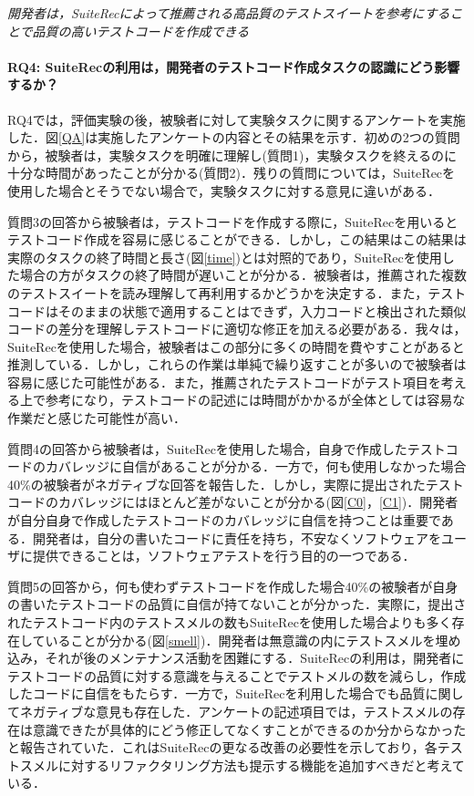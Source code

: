 \documentclass[12pt]{jarticle} %
\begin{document}
\begin{breakbox}
\textit{開発者は，{\sf SuiteRec}によって推薦される高品質のテストスイートを参考にすることで品質の高いテストコードを作成できる}
\end{breakbox}

\paragraph{RQ4: {\sf SuiteRec}の利用は，開発者のテストコード作成タスクの認識にどう影響するか？}

RQ4では，評価実験の後，被験者に対して実験タスクに関するアンケートを実施した．図\ref{QA}は実施したアンケートの内容とその結果を示す．初めの2つの質問から，被験者は，実験タスクを明確に理解し(質問1)，実験タスクを終えるのに十分な時間があったことが分かる(質問2)．残りの質問については，{\sf SuiteRec}を使用した場合とそうでない場合で，実験タスクに対する意見に違いがある．

質問3の回答から被験者は，テストコードを作成する際に，{\sf SuiteRec}を用いるとテストコード作成を容易に感じることができる．しかし，この結果はこの結果は実際のタスクの終了時間と長さ(図\ref{time})とは対照的であり，{\sf SuiteRec}を使用した場合の方がタスクの終了時間が遅いことが分かる．被験者は，推薦された複数のテストスイートを読み理解して再利用するかどうかを決定する．また，テストコードはそのままの状態で適用することはできず，入力コードと検出された類似コードの差分を理解しテストコードに適切な修正を加える必要がある．我々は，{\sf SuiteRec}を使用した場合，被験者はこの部分に多くの時間を費やすことがあると推測している．しかし，これらの作業は単純で繰り返すことが多いので被験者は容易に感じた可能性がある．また，推薦されたテストコードがテスト項目を考える上で参考になり，テストコードの記述には時間がかかるが全体としては容易な作業だと感じた可能性が高い．

質問4の回答から被験者は，{\sf SuiteRec}を使用した場合，自身で作成したテストコードのカバレッジに自信があることが分かる．一方で，何も使用しなかった場合40\%の被験者がネガティブな回答を報告した．しかし，実際に提出されたテストコードのカバレッジにはほとんど差がないことが分かる(図\ref{C0}，\ref{C1})．開発者が自分自身で作成したテストコードのカバレッジに自信を持つことは重要である．開発者は，自分の書いたコードに責任を持ち，不安なくソフトウェアをユーザに提供できることは，ソフトウェアテストを行う目的の一つである．

質問5の回答から，何も使わずテストコードを作成した場合40\%の被験者が自身の書いたテストコードの品質に自信が持てないことが分かった．実際に，提出されたテストコード内のテストスメルの数も{\sf SuiteRec}を使用した場合よりも多く存在していることが分かる(図\ref{smell})．開発者は無意識の内にテストスメルを埋め込み，それが後のメンテナンス活動を困難にする．{\sf SuiteRec}の利用は，開発者にテストコードの品質に対する意識を与えることでテストメルの数を減らし，作成したコードに自信をもたらす．一方で，{\sf SuiteRec}を利用した場合でも品質に関してネガティブな意見も存在した．アンケートの記述項目では，テストスメルの存在は意識できたが具体的にどう修正してなくすことができるのか分からなかったと報告されていた．これは{\sf SuiteRec}の更なる改善の必要性を示しており，各テストスメルに対するリファクタリング方法も提示する機能を追加すべきだと考えている．
\end{document}

